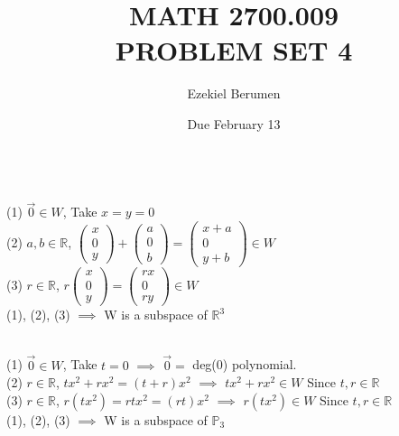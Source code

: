 \documentclass{report}
\title{\Huge{MATH 2700.009}\\PROBLEM SET 4}
\author{\huge{Ezekiel Berumen}}
\date{Due February 13}
\begin{document}
\maketitle
\newpage%

\sol \\
(1) $\vec{0} \in W$, Take $x=y=0$ \\
(2) $a,b \in \mathbb{R}$, $\begin{pmatrix} x \\ 0 \\ y \end{pmatrix} + \begin{pmatrix} a \\ 0 \\ b \end{pmatrix} = \begin{pmatrix} x + a \\ 0 \\ y + b \end{pmatrix} \in W$ \\
(3) $r \in \mathbb{R}$, $r\begin{pmatrix} x \\ 0 \\ y \end{pmatrix} = \begin{pmatrix} rx \\ 0 \\ ry \end{pmatrix} \in W$ \\
(1), (2), (3) $\implies$ W is a subspace of $\mathbb{R}^3$

\sol \\
(1) $\vec{0} \in W$, Take $t=0$ $\implies$ $\vec{0}=$ deg(0) polynomial.  \\
(2) $r\in \mathbb{R}$, $tx^2 + rx^2 = (t + r)x^2$ $\implies$ $tx^2+rx^2 \in W$ Since $t,r \in \mathbb{R}$ \\
(3) $r \in \mathbb{R}$, $r(tx^2) = rtx^2 = (rt)x^2$ $\implies$ $r(tx^2) \in W$ Since $t,r \in \mathbb{R}$\\
(1), (2), (3) $\implies$ W is a subspace of $\mathbb{P}_3$
\end{document}
